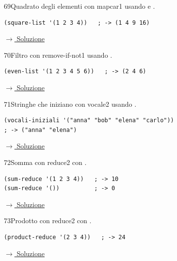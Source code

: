 \bigskip

\label{ex:69}
\begin{essbox}{69}{Quadrato degli elementi con mapcar}{1}
  usando  e .
\nopagebreak
\begin{lstlisting}
(square-list '(1 2 3 4))   ; -> (1 4 9 16)
\end{lstlisting}


\small\color{black!55}\hyperref[sol:69]{$\rightarrow$ Soluzione}\normalsize\color{black}
\end{essbox}

\label{ex:70}
\begin{stdbox}{70}{Filtro con remove-if-not}{1}
  usando .
\nopagebreak
\begin{lstlisting}
(even-list '(1 2 3 4 5 6))   ; -> (2 4 6)
\end{lstlisting}


\small\color{black!55}\hyperref[sol:70]{$\rightarrow$ Soluzione}\normalsize\color{black}
\end{stdbox}

\label{ex:71}
\begin{colbox}{71}{Stringhe che iniziano con vocale}{2}
  usando .
\nopagebreak
\begin{lstlisting}
(vocali-iniziali '("anna" "bob" "elena" "carlo"))
; -> ("anna" "elena")
\end{lstlisting}


\small\color{black!55}\hyperref[sol:71]{$\rightarrow$ Soluzione}\normalsize\color{black}
\end{colbox}

\label{ex:72}
\begin{essbox}{72}{Somma con reduce}{2}
  con .
\nopagebreak
\begin{lstlisting}
(sum-reduce '(1 2 3 4))   ; -> 10
(sum-reduce '())          ; -> 0
\end{lstlisting}


\small\color{black!55}\hyperref[sol:72]{$\rightarrow$ Soluzione}\normalsize\color{black}
\end{essbox}

\label{ex:73}
\begin{colbox}{73}{Prodotto con reduce}{2}
  con .
\nopagebreak
\begin{lstlisting}
(product-reduce '(2 3 4))   ; -> 24
\end{lstlisting}


\small\color{black!55}\hyperref[sol:73]{$\rightarrow$ Soluzione}\normalsize\color{black}
\end{colbox}

